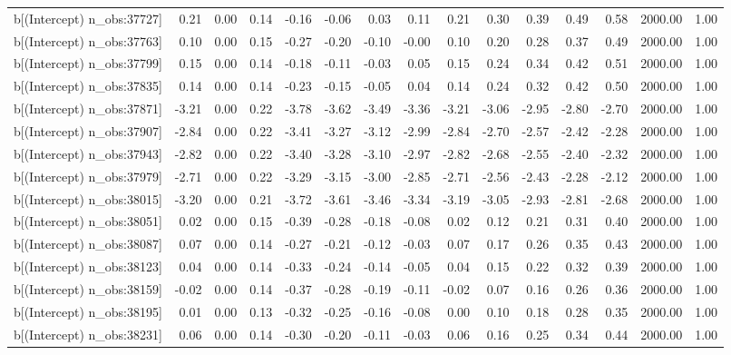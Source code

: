 \begin{table}[ht]
\begin{tabular}{rrrrrrrrrrrrrrr}
  b[(Intercept) n\_obs:37727] & 0.21 & 0.00 & 0.14 & -0.16 & -0.06 & 0.03 & 0.11 & 0.21 & 0.30 & 0.39 & 0.49 & 0.58 & 2000.00 & 1.00 \\ 
  b[(Intercept) n\_obs:37763] & 0.10 & 0.00 & 0.15 & -0.27 & -0.20 & -0.10 & -0.00 & 0.10 & 0.20 & 0.28 & 0.37 & 0.49 & 2000.00 & 1.00 \\ 
  b[(Intercept) n\_obs:37799] & 0.15 & 0.00 & 0.14 & -0.18 & -0.11 & -0.03 & 0.05 & 0.15 & 0.24 & 0.34 & 0.42 & 0.51 & 2000.00 & 1.00 \\ 
  b[(Intercept) n\_obs:37835] & 0.14 & 0.00 & 0.14 & -0.23 & -0.15 & -0.05 & 0.04 & 0.14 & 0.24 & 0.32 & 0.42 & 0.50 & 2000.00 & 1.00 \\ 
  b[(Intercept) n\_obs:37871] & -3.21 & 0.00 & 0.22 & -3.78 & -3.62 & -3.49 & -3.36 & -3.21 & -3.06 & -2.95 & -2.80 & -2.70 & 2000.00 & 1.00 \\ 
  b[(Intercept) n\_obs:37907] & -2.84 & 0.00 & 0.22 & -3.41 & -3.27 & -3.12 & -2.99 & -2.84 & -2.70 & -2.57 & -2.42 & -2.28 & 2000.00 & 1.00 \\ 
  b[(Intercept) n\_obs:37943] & -2.82 & 0.00 & 0.22 & -3.40 & -3.28 & -3.10 & -2.97 & -2.82 & -2.68 & -2.55 & -2.40 & -2.32 & 2000.00 & 1.00 \\ 
  b[(Intercept) n\_obs:37979] & -2.71 & 0.00 & 0.22 & -3.29 & -3.15 & -3.00 & -2.85 & -2.71 & -2.56 & -2.43 & -2.28 & -2.12 & 2000.00 & 1.00 \\ 
  b[(Intercept) n\_obs:38015] & -3.20 & 0.00 & 0.21 & -3.72 & -3.61 & -3.46 & -3.34 & -3.19 & -3.05 & -2.93 & -2.81 & -2.68 & 2000.00 & 1.00 \\ 
  b[(Intercept) n\_obs:38051] & 0.02 & 0.00 & 0.15 & -0.39 & -0.28 & -0.18 & -0.08 & 0.02 & 0.12 & 0.21 & 0.31 & 0.40 & 2000.00 & 1.00 \\ 
  b[(Intercept) n\_obs:38087] & 0.07 & 0.00 & 0.14 & -0.27 & -0.21 & -0.12 & -0.03 & 0.07 & 0.17 & 0.26 & 0.35 & 0.43 & 2000.00 & 1.00 \\ 
  b[(Intercept) n\_obs:38123] & 0.04 & 0.00 & 0.14 & -0.33 & -0.24 & -0.14 & -0.05 & 0.04 & 0.15 & 0.22 & 0.32 & 0.39 & 2000.00 & 1.00 \\ 
  b[(Intercept) n\_obs:38159] & -0.02 & 0.00 & 0.14 & -0.37 & -0.28 & -0.19 & -0.11 & -0.02 & 0.07 & 0.16 & 0.26 & 0.36 & 2000.00 & 1.00 \\ 
  b[(Intercept) n\_obs:38195] & 0.01 & 0.00 & 0.13 & -0.32 & -0.25 & -0.16 & -0.08 & 0.00 & 0.10 & 0.18 & 0.28 & 0.35 & 2000.00 & 1.00 \\ 
  b[(Intercept) n\_obs:38231] & 0.06 & 0.00 & 0.14 & -0.30 & -0.20 & -0.11 & -0.03 & 0.06 & 0.16 & 0.25 & 0.34 & 0.44 & 2000.00 & 1.00 \\ 

\end{tabular}
\end{table}
